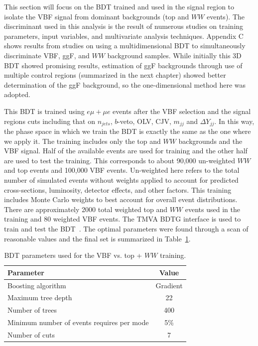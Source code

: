 This section will focus on the BDT trained and used in the signal region to isolate the VBF signal from dominant backgrounds (top and $WW$ events). The discriminant used in this analysis is the result of numerous studies on training parameters, input variables, and multivariate analysis techniques. Appendix C shows results from studies on using a multidimensional BDT to simultaneously discriminate VBF, ggF, and $WW$ background samples. While initially this 3D BDT showed promising results, estimation of ggF backgrounds through use of multiple control regions (summarized in the next chapter) showed better determination of the ggF background, so the one-dimensional method here was adopted. 

This BDT is trained using $e\mu+\mu e$ events after the VBF selection and the signal regions cuts including that on $n_{jets}$, $b$-veto, OLV, CJV, $m_{jj}$ and $\Delta Y_{jj}$. In this way, the phase space in which we train the BDT is exactly the same as the one where we apply it. The training includes only the top and $WW$ backgrounds and the VBF signal. Half of the available events are used for training and the other half are used to test the training. This corresponds to about 90,000 un-weighted $WW$ and top events and 100,000 VBF events. Un-weighted here refers to the total number of simulated events without weights applied to account for predicted cross-sections, luminosity, detector effects, and other factors. This training includes Monte Carlo weights to best account for overall event distributions. There are approximately 2000 total weighted top and $WW$ events used in the training and 80 weighted VBF events. 
The TMVA BDTG interface is used to train and test the BDT~\cite{TMVA}. The optimal parameters were found through a scan of reasonable values and the final set is summarized in Table~\ref{tab:SRBDTparameters}.
\begin{table}[h!]
\centering
\begin{tabular}{|l|c|}
\hline
Parameter                                    & Value     \\
\hline
Boosting algorithm                           &  Gradient  \\
Maximum tree depth                           &  22       \\
Number of trees                              &  400     \\
Minimum number of events requires per mode   &  5\%      \\
Number of cuts                               &  7        \\
\hline
\end{tabular}
\caption{BDT parameters used for the VBF vs. top + $WW$ training.} 
\label{tab:SRBDTparameters}
\end{table}
